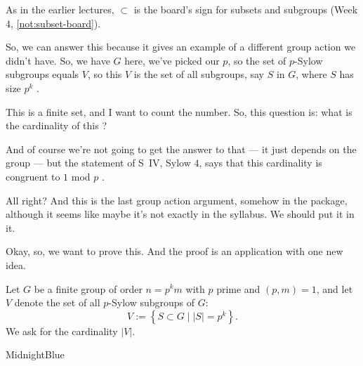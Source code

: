 \begin{aiNote}
As in the earlier lectures, $\subset$ is the board's sign for subsets and subgroups (Week 4, \cref{not:subset-board}).
\end{aiNote}

\begin{speech}[00:01:49 - 00:02:55]
So, we can answer this because it gives an example of a different group action we didn't have. So, we have $G$ here, we've picked our $p$, so the set of $p$-Sylow subgroups equals $V$, so this $V$ is the set of all subgroups, say $S$ in $G$, where $S$ has size $p^k$ .

This is a finite set, and I want to count the number. So, this question is: what is the cardinality of this ?

And of course we're not going to get the answer to that --- it just depends on the group --- but the statement of S~IV, Sylow $4$, says that this cardinality is congruent to $1$ mod $p$ .

All right? And this is the last group action argument, somehow in the package, although it seems like maybe it's not exactly in the syllabus. We should put it in it.

Okay, so, we want to prove this. And the proof is an application with one new idea.
\end{speech}

\begin{content}
Let $G$ be a finite group of order $n = p^k m$ with $p$ prime and $(p, m) = 1$, and let $V$ denote the set of all $p$-Sylow subgroups of $G$:
\[
V := \left\{ S \subset G \;\big|\; |S| = p^k \right\}.
\]
We ask for the cardinality $|V|$.

\begin{highlight}{MidnightBlue}
\end{highlight}
\end{content}

